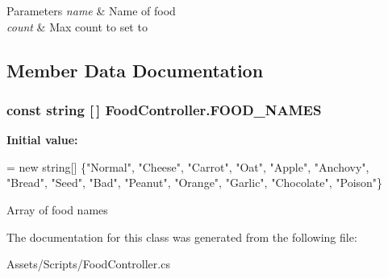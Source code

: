\begin{DoxyParams}{Parameters}
{\em name} & Name of food\\
\hline
{\em count} & Max count to set to\\
\hline
\end{DoxyParams}


\subsection{Member Data Documentation}
\subsubsection[{\texorpdfstring{F\+O\+O\+D\+\_\+\+N\+A\+M\+ES}{FOOD_NAMES}}]{\setlength{\rightskip}{0pt plus 5cm}const string \mbox{[}$\,$\mbox{]} Food\+Controller.\+F\+O\+O\+D\+\_\+\+N\+A\+M\+ES\hspace{0.3cm}{\ttfamily [static]}}\hypertarget{class_food_controller_a8068d88c9eae23423e9b247f2381c600}{}\label{class_food_controller_a8068d88c9eae23423e9b247f2381c600}
{\bfseries Initial value\+:}
\begin{DoxyCode}
= \textcolor{keyword}{new} \textcolor{keywordtype}{string}[]
        \{\textcolor{stringliteral}{"Normal"}, \textcolor{stringliteral}{"Cheese"}, \textcolor{stringliteral}{"Carrot"}, \textcolor{stringliteral}{"Oat"}, \textcolor{stringliteral}{"Apple"}, \textcolor{stringliteral}{"Anchovy"}, \textcolor{stringliteral}{"Bread"}, \textcolor{stringliteral}{"Seed"},
         \textcolor{stringliteral}{"Bad"}, \textcolor{stringliteral}{"Peanut"}, \textcolor{stringliteral}{"Orange"}, \textcolor{stringliteral}{"Garlic"}, \textcolor{stringliteral}{"Chocolate"}, \textcolor{stringliteral}{"Poison"}\}
\end{DoxyCode}


Array of food names 



The documentation for this class was generated from the following file\+:\begin{DoxyCompactItemize}
\item 
Assets/\+Scripts/Food\+Controller.\+cs\end{DoxyCompactItemize}
